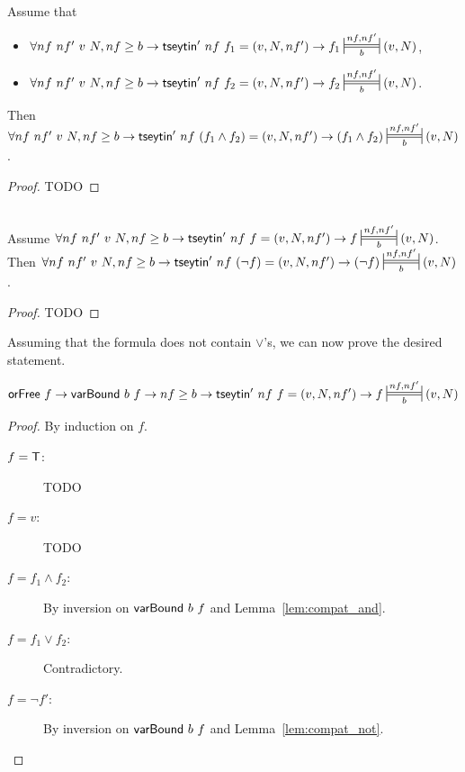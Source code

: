 \begin{lemma}\label{lem:compat_and}
  Assume that 
  \begin{itemize}
    \item $\forall nf~nf'~v~N, nf \ge b \rightarrow \tseytin'~nf~f_1 = (v, N, nf') \rightarrow f_1 \Frepr{nf}{nf'}{b} (v, N)$,
    \item $\forall nf~nf'~v~N, nf \ge b \rightarrow \tseytin'~nf~f_2 = (v, N, nf') \rightarrow f_2 \Frepr{nf}{nf'}{b} (v, N)$.
  \end{itemize}
  Then $\forall nf~nf'~v~N, nf \ge b \rightarrow \tseytin'~nf~(f_1 \land f_2) = (v, N, nf') \rightarrow (f_1 \land f_2) \Frepr{nf}{nf'}{b} (v, N)$.
\end{lemma}
\begin{proof}
  TODO
\end{proof}

\begin{lemma}\label{lem:compat_not}~\\
  Assume $\forall nf~nf'~v~N, nf \ge b \rightarrow \tseytin'~nf~f = (v, N, nf') \rightarrow f \Frepr{nf}{nf'}{b} (v, N)$. 
  Then $\forall nf~nf'~v~N, nf \ge b \rightarrow \tseytin'~nf~(\lnot f) = (v, N, nf') \rightarrow (\lnot f) \Frepr{nf}{nf'}{b} (v, N)$. 
\end{lemma}
\begin{proof}
  TODO
\end{proof}

Assuming that the formula does not contain $\lor$'s, we can now prove the desired statement. 
\begin{theorem}
  \[\orFree~f \rightarrow \varBound~b~f \rightarrow nf \ge b \rightarrow \tseytin'~nf~f = (v, N, nf') \rightarrow f \Frepr{nf}{nf'}{b} (v, N)\] 
\end{theorem}
\begin{proof}
  By induction on $f$.
  \begin{description}
    \item[$f = \mathsf{T}$:] TODO
    \item[$f = v$:] TODO
    \item[$f = f_1 \land f_2$:] By inversion on $\textsf{varBound}~b~f$ and Lemma~\ref{lem:compat_and}.
    \item[$f = f_1 \lor f_2$:] Contradictory.
    \item[$f = \lnot f'$:] By inversion on $\textsf{varBound}~b~f$ and Lemma~\ref{lem:compat_not}.
  \end{description}
\end{proof}

